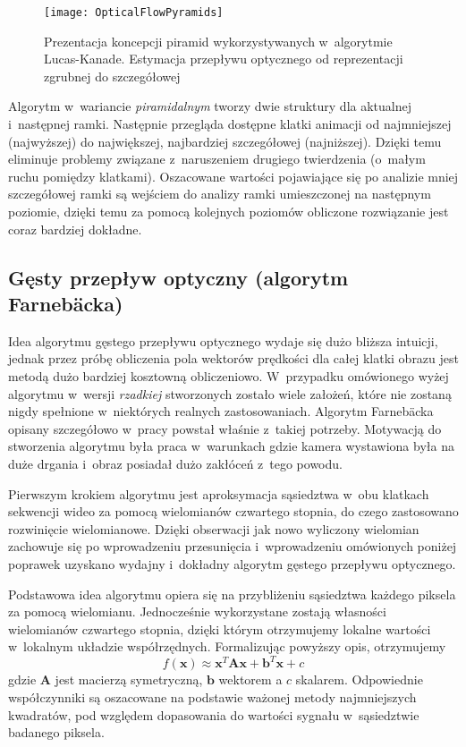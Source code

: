     \begin{figure}[!ht]
      \centering
      \texttt{[image: OpticalFlowPyramids]}
      \caption[Prezentacja koncepcji piramid wykorzystywanych w~algorytmie Lucas-Kanade]{Prezentacja koncepcji piramid wykorzystywanych w~algorytmie Lucas-Kanade. Estymacja przepływu optycznego od reprezentacji zgrubnej do szczegółowej}
      \label{fig:OpticalFlowPyramids}
    \end{figure}

    Algorytm w~wariancie \textit{piramidalnym} tworzy dwie struktury dla aktualnej i~następnej ramki. Następnie przegląda dostępne klatki animacji od najmniejszej (najwyższej) do największej, najbardziej szczegółowej (najniższej). Dzięki temu eliminuje problemy związane z~naruszeniem drugiego twierdzenia (o~małym ruchu pomiędzy klatkami). Oszacowane wartości pojawiające się po analizie mniej szczegółowej ramki są wejściem do analizy ramki umieszczonej na następnym poziomie, dzięki temu za pomocą kolejnych poziomów obliczone rozwiązanie jest coraz bardziej dokładne.

    \subsection{Gęsty przepływ optyczny (algorytm Farnebäcka)}\label{Subsection_DenseOpticalFlow}
    Idea algorytmu gęstego przepływu optycznego wydaje się dużo bliższa intuicji, jednak przez próbę obliczenia pola wektorów prędkości dla całej klatki obrazu jest metodą dużo bardziej kosztowną obliczeniowo. W~przypadku omówionego wyżej algorytmu w~wersji \textit{rzadkiej} stworzonych zostało wiele założeń, które nie zostaną nigdy spełnione w~niektórych realnych zastosowaniach. Algorytm Farnebäcka opisany szczegółowo w~pracy \cite{GunnarFarneback03} powstał właśnie z~takiej potrzeby. Motywacją do stworzenia algorytmu była praca w~warunkach gdzie kamera wystawiona była na duże drgania i~obraz posiadał dużo zakłóceń z~tego powodu.

    Pierwszym krokiem algorytmu jest aproksymacja sąsiedztwa w~obu klatkach sekwencji wideo za pomocą wielomianów czwartego stopnia, do czego zastosowano rozwinięcie wielomianowe. Dzięki obserwacji jak nowo wyliczony wielomian zachowuje się po wprowadzeniu przesunięcia i~wprowadzeniu omówionych poniżej poprawek uzyskano wydajny i~dokładny algorytm gęstego przepływu optycznego.

    Podstawowa idea algorytmu opiera się na przybliżeniu sąsiedztwa każdego piksela za pomocą wielomianu. Jednocześnie wykorzystane zostają własności wielomianów czwartego stopnia, dzięki którym otrzymujemy lokalne wartości w~lokalnym układzie współrzędnych. Formalizując powyższy opis, otrzymujemy \[ f(\mathbf{x}) \approx \mathbf{x}^{T}\mathbf{A}\mathbf{x} + \mathbf{b}^{T}\mathbf{x} + c \] gdzie $\mathbf{A}$ jest macierzą symetryczną, $\mathbf{b}$ wektorem a $c$ skalarem. Odpowiednie współczynniki są oszacowane na podstawie ważonej metody najmniejszych kwadratów, pod względem dopasowania do wartości sygnału w~sąsiedztwie badanego piksela.

